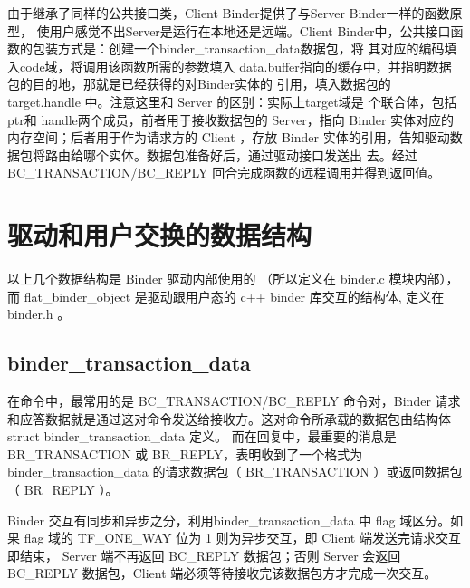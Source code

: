 \documentclass[a4paper,11pt]{article}
\begin{document}
由于继承了同样的公共接口类，Client Binder提供了与Server Binder一样的函数原型，
使用户感觉不出Server是运行在本地还是远端。Client
Binder中，公共接口函数的包装方式是：创建一个binder_transaction_data数据包，将
其对应的编码填入code域，将调用该函数所需的参数填入
data.buffer指向的缓存中，并指明数据包的目的地，那就是已经获得的对Binder实体的
引用，填入数据包的target.handle 中。注意这里和 Server 的区别：实际上target域是
个联合体，包括ptr和 handle两个成员，前者用于接收数据包的 Server，指向  Binder
实体对应的内存空间；后者用于作为请求方的 Client ，存放 Binder
实体的引用，告知驱动数据包将路由给哪个实体。数据包准备好后，通过驱动接口发送出
去。经过 BC_TRANSACTION/BC_REPLY 回合完成函数的远程调用并得到返回值。



\section{驱动和用户交换的数据结构}
以上几个数据结构是 Binder 驱动内部使用的 （所以定义在 binder.c 模块内部）， 而
flat_binder_object 是驱动跟用户态的 c++ binder 库交互的结构体, 定义在
binder.h 。

\subsection{binder_transaction_data}
在命令中，最常用的是 BC_TRANSACTION/BC_REPLY 命令对，Binder
请求和应答数据就是通过这对命令发送给接收方。这对命令所承载的数据包由结构体
struct binder_transaction_data 定义。
而在回复中，最重要的消息是 BR_TRANSACTION 或 BR_REPLY，表明收到了一个格式为
binder_transaction_data 的请求数据包（ BR_TRANSACTION ）或返回数据包（ BR_REPLY
）。


Binder 交互有同步和异步之分，利用binder_transaction_data 中 flag 域区分。如果
flag 域的 TF_ONE_WAY 位为 1 则为异步交互，即 Client 端发送完请求交互即结束，
Server 端不再返回 BC_REPLY 数据包；否则 Server 会返回 BC_REPLY 数据包，Client
端必须等待接收完该数据包方才完成一次交互。
\end{document}
